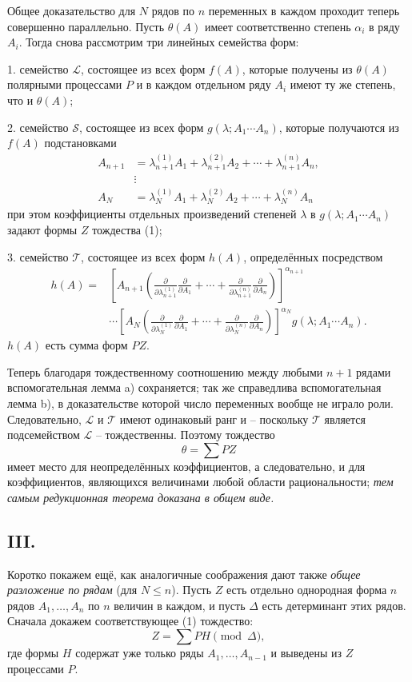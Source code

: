 \documentclass[11pt]{article}
\providecommand{\vdotswithin}[1]{\mathrel{\vdots}}
\begin{document}
Общее доказательство для $N$ рядов по $n$ переменных в каждом проходит теперь совершенно параллельно. Пусть $\theta(A)$ имеет соответственно степень $\alpha_i$ в ряду $A_i$. Тогда снова рассмотрим три линейных семейства форм:

1. семейство $\mathcal L$, состоящее из всех форм $f(A)$, которые получены из $\theta(A)$ полярными процессами $P$ и в каждом отдельном ряду $A_i$ имеют ту же степень, что и $\theta(A)$;

2. семейство $\mathcal S$, состоящее из всех форм $g(\lambda;A_1\cdots A_n)$, которые получаются из $f(A)$ подстановками
\[
\begin{aligned}
 A_{n+1}&=\lambda_{n+1}^{(1)}A_1+\lambda_{n+1}^{(2)}A_2+
        \cdots+\lambda_{n+1}^{(n)}A_n,\\
 &\vdotswithin{=}\\
 A_N&=\lambda_N^{(1)}A_1+\lambda_N^{(2)}A_2+
        \cdots+\lambda_N^{(n)}A_n
\end{aligned}
\]
при этом коэффициенты отдельных произведений степеней $\lambda$ в $g(\lambda;A_1\cdots A_n)$ задают формы $Z$ тождества (1);

3. семейство $\mathcal T$, состоящее из всех форм $h(A)$, определённых посредством
\[
\begin{aligned}
 h(A)=&\left[A_{n+1}\left(
 \frac{\partial}{\partial\lambda_{n+1}^{(1)}}\frac{\partial}{\partial A_1}
 +\cdots+
 \frac{\partial}{\partial\lambda_{n+1}^{(n)}}\frac{\partial}{\partial A_n}\right)\right]^{\alpha_{n+1}} \\
&\cdots
\left[A_N\left(
 \frac{\partial}{\partial\lambda_N^{(1)}}\frac{\partial}{\partial A_1}
 +\cdots+
 \frac{\partial}{\partial\lambda_N^{(n)}}\frac{\partial}{\partial A_n}\right)\right]^{\alpha_N}
 g(\lambda;A_1\cdots A_n).
\end{aligned}
\]
$h(A)$ есть сумма форм $PZ$.

Теперь благодаря тождественному соотношению между любыми $n+1$ рядами вспомогательная лемма a) сохраняется; так же справедлива вспомогательная лемма b), в доказательстве которой число переменных вообще не играло роли. Следовательно, $\mathcal L$ и $\mathcal T$ имеют одинаковый ранг и -- поскольку $\mathcal T$ является подсемейством $\mathcal L$ -- тождественны. Поэтому тождество
\[
  \theta=\sum PZ
\]
имеет место для неопределённых коэффициентов, а следовательно, и для коэффициентов, являющихся величинами любой области рациональности; \emph{тем самым редукционная теорема доказана в общем виде.}

\subsection*{III.}
Коротко покажем ещё, как аналогичные соображения дают также \emph{общее разложение по рядам} (для $N\le n$). Пусть $Z$ есть отдельно однородная форма $n$ рядов $A_1,\ldots,A_n$ по $n$ величин в каждом, и пусть $\Delta$ есть детерминант этих рядов. Сначала докажем соответствующее (1) тождество:
\begin{equation}
  Z=\sum PH \pmod{\Delta},
\tag{2}
\end{equation}
где формы $H$ содержат уже только ряды $A_1,\ldots,A_{n-1}$ и выведены из $Z$ процессами $P$.
\end{document}
